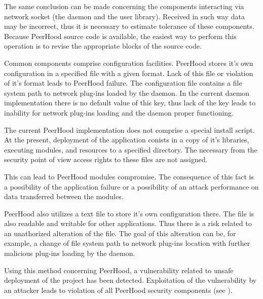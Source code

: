 %
The same conclusion can be made concerning the components interacting via network socket (the daemon and the user library). 
%
Received in \A such way data may be incorrect, thus it is necessary to estimate tolerance of these components. 
%
Because PeerHood source code is available, the easiest way to perform this operation is to revise the appropriate blocks of the source code. 

%
Common components comprise configuration facilities. 
%
PeerHood stores it's own configuration in a specified file with a given format. 
%
Lack of this file or violation of it's format leads to PeerHood failure. 
%
The configuration file contains a file system path to network plug-ins loaded by the daemon. 
%
In the current daemon implementation there is no default value of this key, thus lack of the key leads to inability for network plug-ins loading and the daemon proper functioning. 

%
The current PeerHood implementation does not comprise a special install script. 
%
At the present, deployment of the application conists in a copy of it's libraries, executing modules, and resources to a specified directory. 
%
The necessary from the security point of view access rights to these files are not assigned. 

%
This can lead to PeerHood modules compromise. 
%
The consequence of this fact is a possibility of the application failure or a possibility of an attack performance on data transferred between the modules. 

%
PeerHood also utilizes a text file to store it's own configuration there. 
%
The file is also readable and writable for other applications. 
%
Thus there is a risk related to an unathorized alteration of the file. 
%
The goal of this alteration can be, for example, a change of file system path to network plug-ins location with further malicious plug-ins loading by the daemon. 

%
Using this method concerning PeerHood, a vulnerability related to unsafe deployment of the project has been detected. 
%
Exploitation of the vulnerability by an attacker leads to violation of all PeerHood security components (see ). 


